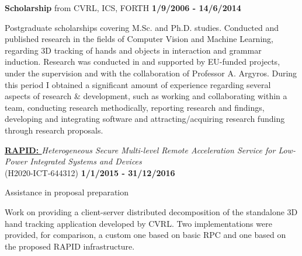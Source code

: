 \documentclass[10pt]{article}
\newenvironment{outerlist}[1][\enskip\textbullet]%
        {\begin{itemize}[#1]}{\end{itemize}%
         \vspace{-.6\baselineskip}}
\newenvironment{innerlist}[1][\enskip\textbullet]%
        {\begin{compactitem}[#1]}{\end{compactitem}}
\begin{document}
\begin{outerlist}
        \item[] \textbf{Scholarship} from \ac{CVRL}, \ac{ICS}, \ac{FORTH} \hfill \textbf{1/9/2006 - 14/6/2014}
        \begin{innerlist}
                \item Postgraduate scholarships covering M.Sc. and Ph.D. studies. Conducted and published research in the fields of Computer Vision and Machine Learning, regarding 3D tracking of hands and objects in interaction and grammar induction. Research was conducted in and supported by EU-funded projects, under the supervision and with the collaboration of Professor A. Argyros.
During this period I obtained a significant amount of experience regarding several aspects of research \& development, such as working and collaborating within a team, conducting research methodically, reporting research and findings, developing and integrating software and attracting/acquiring research funding through research proposals.
        \end{innerlist}

        \item[] {\bf \href{http://rapid-project.eu/}{RAPID: }}\textit{Heterogeneous Secure Multi-level Remote Acceleration Service for Low-Power Integrated Systems and Devices} \\ (H2020-ICT-644312) \hfill \textbf{1/1/2015 - 31/12/2016}
        \begin{innerlist}
            \item Assistance in proposal preparation
            \item Work on providing a client-server distributed decomposition of the standalone 3D hand tracking application developed by \ac{CVRL}. Two implementations were provided, for comparison, a custom one based on basic \ac{RPC} and one based on the proposed RAPID infrastructure.
        \end{innerlist}
                        

\end{outerlist}
\end{document}

